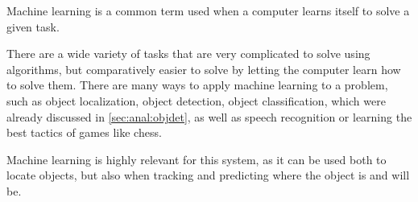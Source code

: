 Machine learning is a common term used when a computer learns itself to solve a given task\cite{ArtificialIntelligencealanpoole}.

There are a wide variety of tasks that are very complicated to solve using algorithms, but comparatively easier to solve by letting the computer learn how to solve them.
There are many ways to apply machine learning to a problem, such as object localization, object detection, object classification, which were already discussed in \autoref{sec:anal:objdet}, as well as speech recognition or learning the best tactics of games like chess.

Machine learning is highly relevant for this system, as it can be used both to locate objects, but also when tracking and predicting where the object is and will be.
